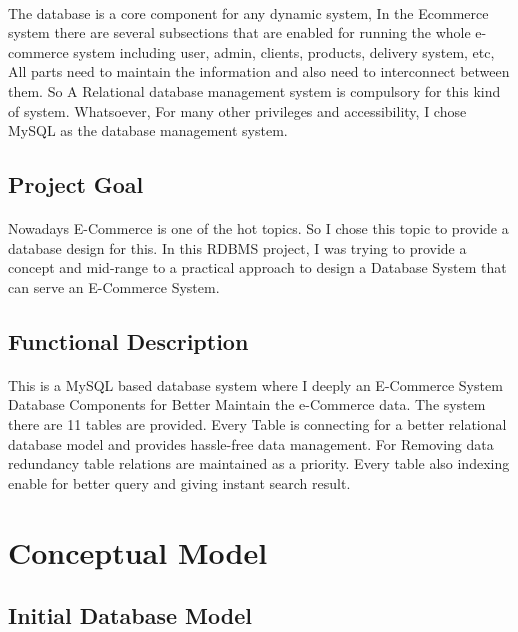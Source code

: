 \documentclass{article}
\begin{document}
	\paragraph{}
		The database is a core component for any dynamic system, In the Ecommerce system there are several subsections that are enabled for running the whole e-commerce system including user, admin, clients, products, delivery system, etc, All parts need to maintain the information and also need to interconnect between them. So A Relational database management system is compulsory for this kind of system. Whatsoever, For many other privileges and accessibility, I chose MySQL as the database management system.
	\subsection{Project Goal}
	\paragraph{}
		Nowadays E-Commerce is one of the hot topics. So I chose this topic to provide a database design for this. In this RDBMS project, I was trying to provide a concept and mid-range to a practical approach to design a Database System that can serve an E-Commerce System.
	\subsection{Functional Description}
	\paragraph{}
		This is a MySQL based database system where I deeply an E-Commerce System Database Components for Better Maintain the e-Commerce data. The system there are 11 tables are provided. Every Table is connecting for a better relational database model and provides hassle-free data management. For Removing data redundancy table relations are maintained as a priority. Every table also indexing enable for better query and giving instant search result.
		\pagebreak
		\vspace*{2 cm}
	\section{Conceptual Model}
	\subsection{Initial Database Model}
\end{document}

